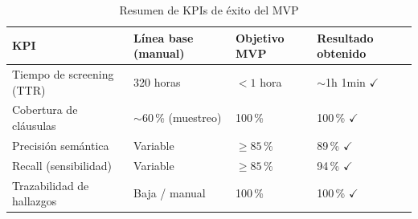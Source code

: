 \begin{table}[H]
\centering
\caption{Resumen de KPIs de éxito del MVP}
\label{tab:kpis_resumen}
\begin{tabular}{p{4.5cm}p{3.5cm}p{3cm}p{3.5cm}}
\toprule
\textbf{KPI} & \textbf{Línea base (manual)} & \textbf{Objetivo MVP} & \textbf{Resultado obtenido} \\
\midrule
Tiempo de screening (TTR) & 320 horas & $< 1$ hora & $\sim$1h 1min $\checkmark$ \\
Cobertura de cláusulas & $\sim$60\,\% (muestreo) & 100\,\% & 100\,\% $\checkmark$ \\
Precisión semántica & Variable & $\geq 85\,\text{\%}$ & 89\,\% $\checkmark$ \\
Recall (sensibilidad) & Variable & $\geq 85\,\text{\%}$ & 94\,\% $\checkmark$ \\
Trazabilidad de hallazgos & Baja / manual & 100\,\% & 100\,\% $\checkmark$ \\
\bottomrule
\end{tabular}
\end{table}